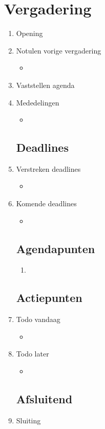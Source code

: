 \documentclass{article}
\begin{document}
\section*{Vergadering}
\begin{enumerate}
	
	\subsection*{Vooraf}
	\item Opening
	\item Notulen vorige vergadering
	\begin{itemize}
		\item
	\end{itemize}
	\item Vaststellen agenda
	\item Mededelingen
	\begin{itemize}
		\item
	\end{itemize}

	\subsection*{Deadlines}
	\item Verstreken deadlines
	\begin{itemize}
		\item
	\end{itemize}
	\item Komende deadlines
	\begin{itemize}
		\item
	\end{itemize}

	\subsection*{Agendapunten}
	\begin{enumerate}
	\item
	\end{enumerate}
	

	\subsection*{Actiepunten}
	\item Todo vandaag
	\begin{itemize}
		\item
	\end{itemize}
	\item Todo later
	\begin{itemize}
		\item
	\end{itemize}

	\noindent 
	\subsection*{Afsluitend}
	\item Sluiting %

\end{enumerate}
\end{document}
